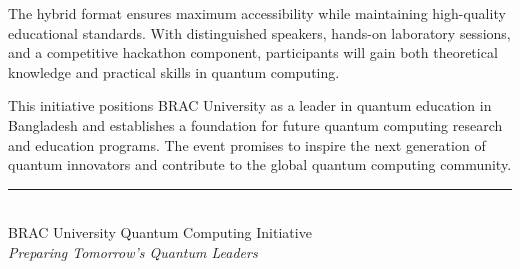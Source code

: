 \documentclass[11pt,a4paper]{article}
\begin{document}
The hybrid format ensures maximum accessibility while maintaining high-quality educational standards. With distinguished speakers, hands-on laboratory sessions, and a competitive hackathon component, participants will gain both theoretical knowledge and practical skills in quantum computing.

This initiative positions BRAC University as a leader in quantum education in Bangladesh and establishes a foundation for future quantum computing research and education programs. The event promises to inspire the next generation of quantum innovators and contribute to the global quantum computing community.

\vspace{1cm}

\begin{center}
\rule{0.8\textwidth}{0.4pt}\\[0.3cm]
BRAC University Quantum Computing Initiative \\
\textit{Preparing Tomorrow's Quantum Leaders}
\end{center}
\end{document}
